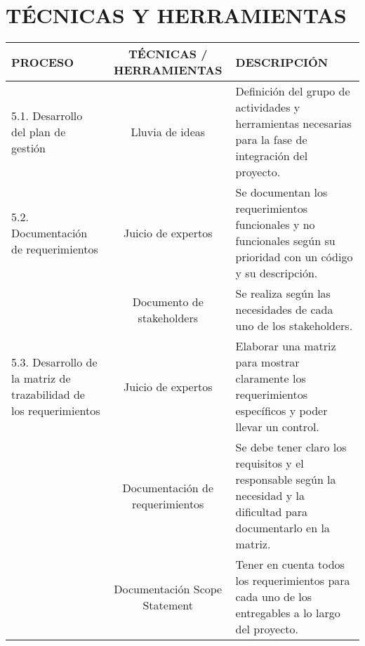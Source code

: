 \chapter{T\'ECNICAS Y HERRAMIENTAS}
%
\begin{table}[H]
	\centering
	\begin{tabular}{| m{5cm} | c | p{5cm} |}
	\hline
	\rowcolor{LightGrey}
	\textbf{PROCESO} & \textbf{T\'ECNICAS / HERRAMIENTAS} & \textbf{DESCRIPCI\'ON} \\ \hline
	5.1. Desarrollo del plan de gesti\'on & Lluvia de ideas & Definici\'on del grupo de actividades y herramientas 
	necesarias para la fase de integraci\'on del proyecto.\\
	\hline
	5.2. Documentaci\'on de requerimientos & Juicio de expertos & Se documentan los requerimientos funcionales y no 
	funcionales seg\'un su prioridad con un c\'odigo y su descripci\'on. \\
	\cline{2-3}
	& Documento de stakeholders & Se realiza seg\'un las necesidades de cada uno de los stakeholders.\\
	\hline
	5.3. Desarrollo de la matriz de trazabilidad de los requerimientos & Juicio de expertos & Elaborar una matriz
	 para mostrar claramente los requerimientos espec\'ificos  y poder llevar un control.\\
	 \cline{2-3}
	& Documentaci\'on de requerimientos & Se debe tener claro los requisitos y el responsable seg\'un la necesidad y
	 la dificultad para documentarlo en la matriz.\\
	\cline{2-3}
	& Documentaci\'on Scope Statement & Tener en cuenta todos los requerimientos para cada uno de los entregables a 
	lo largo del proyecto.\\
	\hline
	\end{tabular}
\end{table}